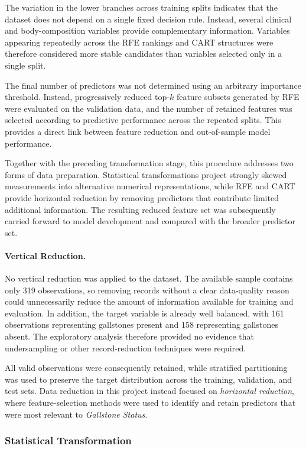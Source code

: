 The variation in the lower branches across training splits indicates that the
dataset does not depend on a single fixed decision rule. Instead, several
clinical and body-composition variables provide complementary information.
Variables appearing repeatedly across the RFE rankings and CART structures were
therefore considered more stable candidates than variables selected only in a
single split.

The final number of predictors was not determined using an arbitrary importance
threshold. Instead, progressively reduced top-$k$ feature subsets generated by
RFE were evaluated on the validation data, and the number of retained features
was selected according to predictive performance across the repeated splits.
This provides a direct link between feature reduction and out-of-sample model
performance.

Together with the preceding transformation stage, this procedure addresses two
forms of data preparation. Statistical transformations project strongly skewed
measurements into alternative numerical representations, while RFE and CART
provide horizontal reduction by removing predictors that contribute limited
additional information. The resulting reduced feature set was subsequently
carried forward to model development and compared with the broader predictor
set.

\paragraph{Vertical Reduction.}
No vertical reduction was applied to the dataset. The available sample contains only 319 observations, so removing records without a clear data-quality reason could unnecessarily reduce the amount of information available for training and evaluation. In addition, the target variable is
already well balanced, with 161 observations representing gallstones present and 158 representing gallstones absent. The exploratory analysis therefore provided no evidence that undersampling or other record-reduction techniques
were required.

All valid observations were consequently retained, while stratified partitioning was used to preserve the target distribution across the
training, validation, and test sets. Data reduction in this project instead
focused on \textit{horizontal reduction}, where feature-selection methods were
used to identify and retain predictors that were most relevant to \textit{Gallstone Status}.

\subsubsection{Statistical Transformation}
\label{subsec:data-transformation}

